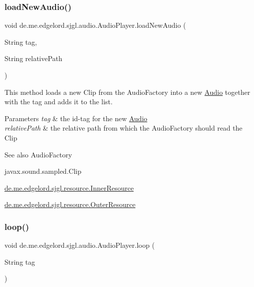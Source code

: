 \subsubsection{\texorpdfstring{load\+New\+Audio()}{loadNewAudio()}}
{\footnotesize\ttfamily void de.\+me.\+edgelord.\+sjgl.\+audio.\+Audio\+Player.\+load\+New\+Audio (\begin{DoxyParamCaption}\item[{String}]{tag,  }\item[{String}]{relative\+Path }\end{DoxyParamCaption})}

This method loads a new {\ttfamily Clip} from the {\ttfamily Audio\+Factory} into a new {\ttfamily \mbox{\hyperlink{classde_1_1me_1_1edgelord_1_1sjgl_1_1audio_1_1_audio}{Audio}}} together with the tag and adds it to the list.


\begin{DoxyParams}{Parameters}
{\em tag} & the id-\/tag for the new {\ttfamily \mbox{\hyperlink{classde_1_1me_1_1edgelord_1_1sjgl_1_1audio_1_1_audio}{Audio}}} \\
\hline
{\em relative\+Path} & the relative path from which the {\ttfamily Audio\+Factory} should read the {\ttfamily Clip}\\
\hline
\end{DoxyParams}
\begin{DoxySeeAlso}{See also}
Audio\+Factory 

javax.\+sound.\+sampled.\+Clip 

\mbox{\hyperlink{classde_1_1me_1_1edgelord_1_1sjgl_1_1resource_1_1_inner_resource}{de.\+me.\+edgelord.\+sjgl.\+resource.\+Inner\+Resource}} 

\mbox{\hyperlink{classde_1_1me_1_1edgelord_1_1sjgl_1_1resource_1_1_outer_resource}{de.\+me.\+edgelord.\+sjgl.\+resource.\+Outer\+Resource}} 
\end{DoxySeeAlso}
\mbox{\label{classde_1_1me_1_1edgelord_1_1sjgl_1_1audio_1_1_audio_player_a4773c3bc2054fcb5f7892ebf330c68b8}} 
\subsubsection{\texorpdfstring{loop()}{loop()}}
{\footnotesize\ttfamily void de.\+me.\+edgelord.\+sjgl.\+audio.\+Audio\+Player.\+loop (\begin{DoxyParamCaption}\item[{String}]{tag }\end{DoxyParamCaption})}

